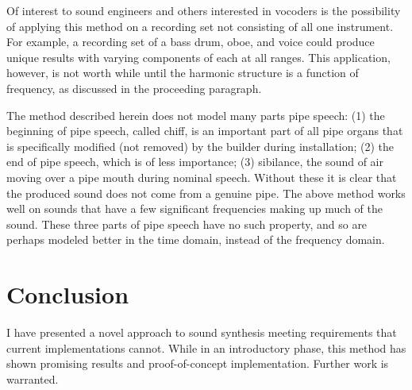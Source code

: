 \documentclass[twocolumn]{article}
\begin{document}
Of interest to sound engineers and others interested in vocoders is the possibility of applying this method on a recording set not consisting of all one instrument. For example, a recording set of a bass drum, oboe, and voice could produce unique results with varying components of each at all ranges. This application, however, is not worth while until the harmonic structure is a function of frequency, as discussed in the proceeding paragraph.

The method described herein does not model many parts pipe speech: (1) the beginning of pipe speech, called chiff, is an important part of all pipe organs that is specifically modified (not removed) by the builder during installation; (2) the end of pipe speech, which is of less importance; (3) sibilance, the sound of air moving over a pipe mouth during nominal speech. Without these it is clear that the produced sound does not come from a genuine pipe. The above method works well on sounds that have a few significant frequencies making up much of the sound. These three parts of pipe speech have no such property, and so are perhaps modeled better in the time domain, instead of the frequency domain.

\section{Conclusion}

I have presented a novel approach to sound synthesis meeting requirements that current implementations cannot. While in an introductory phase, this method has shown promising results and proof-of-concept implementation. Further work is warranted.
\end{document}
